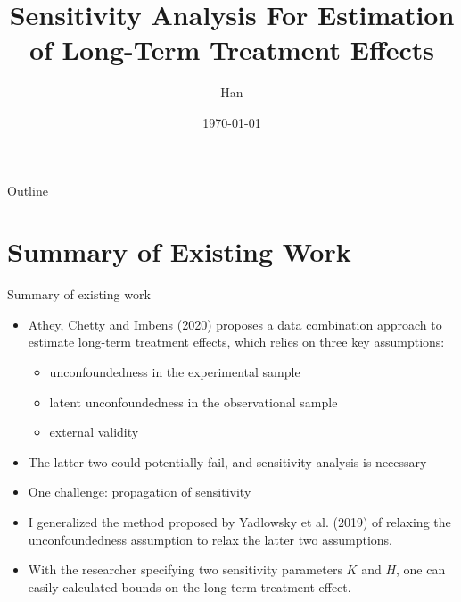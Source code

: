 \documentclass{beamer}					%
\title{Sensitivity Analysis For Estimation of Long-Term Treatment Effects}	%
\author{Han}								%
\institute{Penn State, Department of Economics}					%
\date{\today}									%
\begin{document}
\begin{frame}
  \titlepage
\end{frame}

\begin{frame}{Outline}
  \tableofcontents
\end{frame}

%
\section{Summary of Existing Work}

\begin{frame}{Summary of existing work}
    \begin{itemize}
        \item Athey, Chetty and Imbens (2020) proposes a data combination approach to estimate long-term treatment effects, which relies on three key assumptions:
        \begin{itemize}
            \item unconfoundedness in the experimental sample
            \item latent unconfoundedness in the observational sample
            \item external validity
        \end{itemize}
        \item The latter two could potentially fail, and sensitivity analysis is necessary
        \item One challenge: propagation of sensitivity
        \item I generalized the method proposed by Yadlowsky et al. (2019) of relaxing the  unconfoundedness assumption to relax the latter two assumptions. 
        \item With the researcher specifying two sensitivity parameters $K$ and $H$, one can easily calculated bounds on the long-term treatment effect.
    \end{itemize}
\end{frame}
\end{document}
